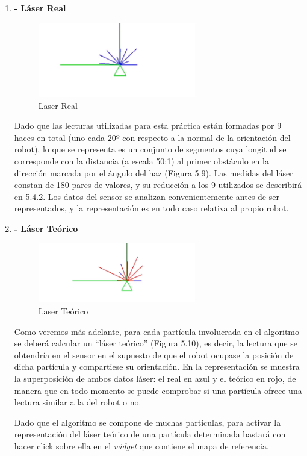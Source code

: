 \begin{enumerate}
	\item \textbf{- Láser Real}
	\begin{figure}[H]
		\begin{center}
			\includegraphics[width=0.65\textwidth]{figures/laserreal.png}
			\caption{Laser Real}
			\label{fig.laserreal}
			\end{center}
	\end{figure}
Dado que las lecturas utilizadas para esta práctica están formadas por 9 haces en total (uno cada 20º con respecto a la normal de la orientación del robot), lo que se representa es un conjunto de segmentos cuya longitud se corresponde con la distancia (a escala 50:1) al primer obstáculo en la dirección marcada por el ángulo del haz (Figura 5.9). Las medidas del láser constan de 180 pares de valores, y su reducción a los 9 utilizados se describirá en 5.4.2. Los datos del sensor se analizan convenientemente antes de ser representados, y la representación es en todo caso relativa al propio robot.
\item \textbf{- Láser Teórico}
	\begin{figure}[H]
		\begin{center}
			\includegraphics[width=0.65\textwidth]{figures/laserteorico.png}
			\caption{Laser Teórico}
			\label{fig.laserteorico}
			\end{center}
	\end{figure}
Como veremos más adelante, para cada partícula involucrada en el algoritmo se deberá calcular un “láser teórico” (Figura 5.10), es decir, la lectura que se obtendría en el sensor en el supuesto de que el robot ocupase la posición de dicha partícula y compartiese su orientación. En la representación se muestra la superposición de ambos datos láser: el real en azul y el teórico en rojo, de manera que en todo momento se puede comprobar si una partícula ofrece una lectura similar a la del robot o no. 

Dado que el algoritmo se compone de muchas partículas, para activar la representación del láser teórico de una partícula determinada bastará con hacer click sobre ella en el \textit{widget} que contiene el mapa de referencia.
\end{enumerate}

